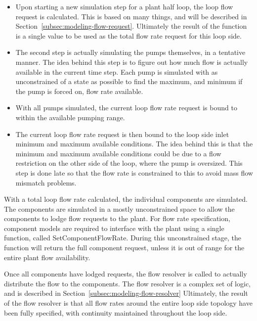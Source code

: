 \documentclass{report}
\begin{document}
    \begin{itemize}
        \item Upon starting a new simulation step for a plant half loop, the loop flow request is calculated.
              This is based on many things, and will be described in Section~\ref{subsec:modeling-flow-request}.
              Ultimately the result of the function is a single value to be used as the total flow rate request for this loop side.
        \item The second step is actually simulating the pumps themselves, in a tentative manner.
              The idea behind this step is to figure out how much flow is actually available in the current time step.
              Each pump is simulated with as unconstrained of a state as possible to find the maximum, and minimum if the pump is forced on, flow rate available.
        \item With all pumps simulated, the current loop flow rate request is bound to within the available pumping range.
        \item The current loop flow rate request is then bound to the loop side inlet minimum and maximum available conditions.
              The idea behind this is that the minimum and maximum available conditions could be due to a flow restriction on the other side of the loop, where the pump is oversized.
              This step is done late so that the flow rate is constrained to this to avoid mass flow mismatch problems.
    \end{itemize}

    With a total loop flow rate calculated, the individual components are simulated.
    The components are simulated in a mostly unconstrained space to allow the components to lodge flow requests to the plant.
    For flow rate specification, component models are required to interface with the plant using a single function, called SetComponentFlowRate.
    During this unconstrained stage, the function will return the full component request, unless it is out of range for the entire plant flow availability.

    Once all components have lodged requests, the flow resolver is called to actually distribute the flow to the components.
    The flow resolver is a complex set of logic, and is described in Section~\ref{subsec:modeling-flow-resolver}
    Ultimately, the result of the flow resolver is that all flow rates around the entire loop side topology have been fully specified, with continuity maintained throughout the loop side.
\end{document}
